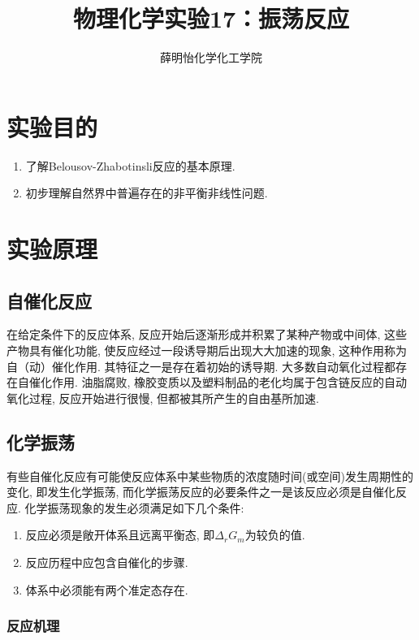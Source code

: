 \documentclass[a4paper]{article}
\title{物理化学实验17：振荡反应}
\author{薛明怡\quad 151250177\quad 化学化工学院}
\date{}
\begin{document}
\maketitle

\section{实验目的}
\begin{enumerate}
\item 了解Belousov-Zhabotinsli反应的基本原理.
\item 初步理解自然界中普遍存在的非平衡非线性问题.
\end{enumerate}
\section{实验原理}
\subsection{自催化反应}
在给定条件下的反应体系, 反应开始后逐渐形成并积累了某种产物或中间体, 这些产物具有催化功能, 
使反应经过一段诱导期后出现大大加速的现象, 这种作用称为自（动）催化作用. 其特征之一是存在着初始的诱导期. 
大多数自动氧化过程都存在自催化作用. 油脂腐败, 橡胶变质以及塑料制品的老化均属于包含链反应的自动氧化过程, 
反应开始进行很慢, 但都被其所产生的自由基所加速.
\subsection{化学振荡}
有些自催化反应有可能使反应体系中某些物质的浓度随时间(或空间)发生周期性的变化, 
即发生化学振荡, 而化学振荡反应的必要条件之一是该反应必须是自催化反应. 化学振荡现象的发生必须满足如下几个条件:
\begin{enumerate}
    \item 反应必须是敞开体系且远离平衡态, 即$\Delta_{r} G_{m}$为较负的值.
    \item 反应历程中应包含自催化的步骤.
    \item 体系中必须能有两个准定态存在.
\end{enumerate}
\subsubsection{反应机理}
\subsection{}
\end{document}
